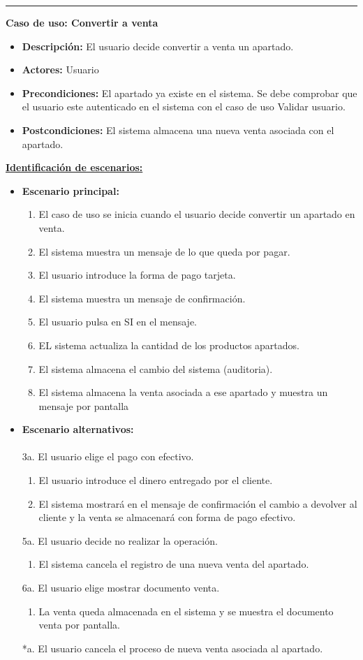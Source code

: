 \smallskip
\hrule height 1pt
\smallskip
\textbf{Caso de uso: Convertir a venta}
\begin{itemize}\renewcommand{\labelitemi}{$\cdot$}
 \item \textbf{Descripción:} El usuario decide convertir a venta un apartado.
  \item \textbf{Actores:} Usuario
  \item \textbf{Precondiciones:} El apartado ya existe en el sistema. Se debe comprobar que el usuario este autenticado en el sistema con el caso de uso Validar usuario.
  \item \textbf{Postcondiciones:} El sistema almacena una nueva venta asociada con el apartado.
\end{itemize}
\underline{\textbf{Identificación de escenarios:}}
\begin{itemize}\renewcommand{\labelitemi}{$\circ$}
 \item \textbf{Escenario principal:}
         \begin{enumerate}
          \item El caso de uso se inicia cuando el usuario decide convertir un apartado en venta.
	  \item El sistema muestra un mensaje de lo que queda por pagar.
	  \item El usuario introduce la forma de pago tarjeta.
	  \item El sistema muestra un mensaje de confirmación.
	  \item El usuario pulsa en SI en el mensaje.
	  \item EL sistema actualiza la cantidad de los productos apartados.
	  \item El sistema almacena el cambio del sistema (auditoria).
	  \item El sistema almacena la venta asociada a ese apartado y muestra un mensaje por pantalla
         \end{enumerate}
\item \textbf{Escenario alternativos:}\\\\
	3a. El usuario elige el pago con efectivo.
		\begin{enumerate}
		\item El usuario introduce el dinero entregado por el cliente.
		 \item El sistema mostrará en el mensaje de confirmación el cambio a devolver al cliente y la venta se almacenará con forma de pago efectivo.
		\end{enumerate}
	 5a. El usuario decide no realizar la operación.
	      \begin{enumerate}
	       \item El sistema cancela el registro de una nueva venta del apartado.
	      \end{enumerate}
         6a. El usuario elige mostrar documento venta.
	      \begin{enumerate}
	       \item La venta queda almacenada en el sistema y se muestra el documento venta por pantalla.
	      \end{enumerate}
          *a. El usuario cancela el proceso de nueva venta asociada al apartado.
\end{itemize}

